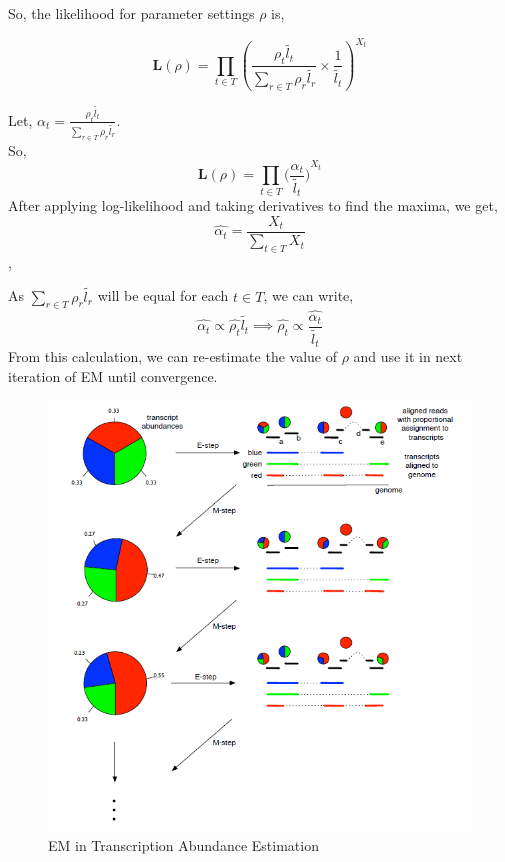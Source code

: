 So, the likelihood for parameter settings $\rho$ is,

\begin{displaymath} {\mathbf{L}(\rho)}=\prod_{t \in T}{{({\frac{ {\rho_t} {\tilde{l_t}}  }{ \sum_{r \in T} { {\rho_r}{\tilde{l_r}}} }
\times \frac{1}{\tilde{l_t}}
})}^{X_t}}
\end{displaymath}

Let, $\alpha_t=\frac{ {\rho_t} {\tilde{l_t}}  }{ \sum_{r \in T} { {\rho_r}{\tilde{l_r}}} }
$.\\So,
\begin{displaymath} {\mathbf{L}(\rho)}=\prod_{t \in T}{({\frac{\alpha_t}{\tilde{l_t}}) } ^{X_t} }
\end{displaymath} 
After applying log-likelihood and taking derivatives to find the maxima, we get,
\begin{displaymath}
\hat{\alpha_t}= \frac{{X_t}}{\sum_{t \in T}{{X_t}}}
\end{displaymath},

As ${\sum_{r \in T} { {\rho_r}{\tilde{l_r}}}}$ will be equal for each $t \in T$, we can write,
\begin{displaymath}
\hat{\alpha_t} \propto {{\hat{{\rho_t}} { \tilde{l_t} } } }
\implies  \hat{\rho_t} \propto {{\frac{\hat{\alpha_t}}{\tilde{l_t}}}}
\end{displaymath}
From this calculation, we can re-estimate the value of $\rho$ and use it in next iteration of EM until convergence.

\begin{figure}[h]
\centering
\includegraphics[scale=0.60]{ex.png}
\caption{EM in Transcription Abundance Estimation~\cite{pachter2011models}}
\label{}
\end{figure}